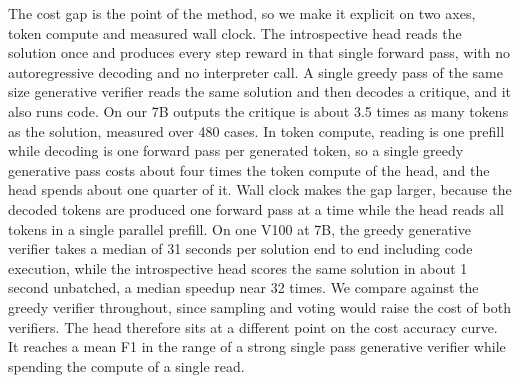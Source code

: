 The cost gap is the point of the method, so we make it explicit on two axes, token compute and measured wall clock. The introspective head reads the solution once and produces every step reward in that single forward pass, with no autoregressive decoding and no interpreter call. A single greedy pass of the same size generative verifier reads the same solution and then decodes a critique, and it also runs code. On our 7B outputs the critique is about 3.5 times as many tokens as the solution, measured over 480 cases. In token compute, reading is one prefill while decoding is one forward pass per generated token, so a single greedy generative pass costs about four times the token compute of the head, and the head spends about one quarter of it. Wall clock makes the gap larger, because the decoded tokens are produced one forward pass at a time while the head reads all tokens in a single parallel prefill. On one V100 at 7B, the greedy generative verifier takes a median of 31 seconds per solution end to end including code execution, while the introspective head scores the same solution in about 1 second unbatched, a median speedup near 32 times. We compare against the greedy verifier throughout, since sampling and voting would raise the cost of both verifiers. The head therefore sits at a different point on the cost accuracy curve. It reaches a mean F1 in the range of a strong single pass generative verifier while spending the compute of a single read.

